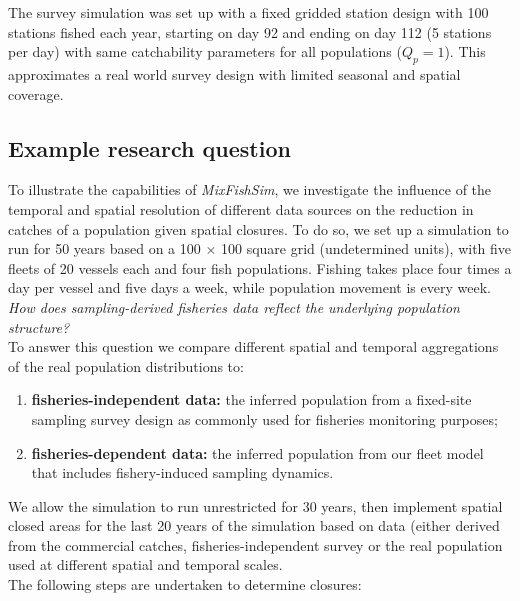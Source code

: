 \documentclass[review]{elsarticle}
\begin{document}
The survey simulation was set up with a fixed gridded station design with 100
stations fished each year, starting on day 92 and ending on day 112 (5 stations
per day) with same catchability parameters for all populations ($Q_{p} = 1$).
This approximates a real world survey design with limited seasonal and spatial
coverage. 

\subsection{Example research question}

To illustrate the capabilities of \textit{MixFishSim}, we investigate the
influence of the temporal and spatial resolution of different data sources on
the reduction in catches of a population given spatial closures. To do so, we
set up a simulation to run for 50 years based on a 100 $\times$ 100 square grid
(undetermined units), with five fleets of 20 vessels each and four fish
populations. Fishing takes place four times a day per vessel and five days a
week, while population movement is every week. \\

\textit{How does sampling-derived fisheries data reflect the underlying
	population structure?} \\

To answer this question we compare different spatial and temporal aggregations
of the real population distributions to:
\begin{enumerate}[label=\alph*)]
	\item \textbf{fisheries-independent data:} the inferred population from
		a fixed-site sampling survey design as commonly used for
		fisheries monitoring purposes;
	\item \textbf{fisheries-dependent data:} the inferred population from
		our fleet model that includes fishery-induced sampling
		dynamics.
\end{enumerate}

We allow the simulation to run unrestricted for 30 years, then implement
spatial closed areas for the last 20 years of the simulation based on data
(either derived from the commercial catches, fisheries-independent survey or
the real population used at different spatial and temporal scales. \\

The following steps are undertaken to determine closures:
\end{document}
